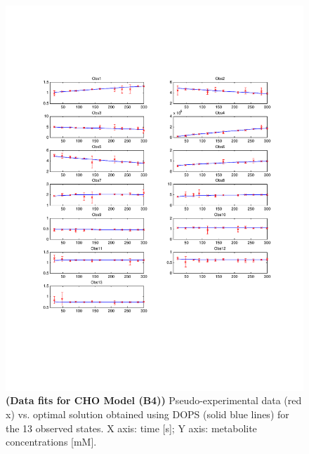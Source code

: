 \documentclass[12pt]{article}
\begin{document}
\begin{figure}[ht]
\centering
\includegraphics[width=1.00\textwidth]{./figs/Figure_S2_B4_sims.pdf}
\caption{\textbf {(Data fits for CHO Model (B4))} Pseudo-experimental data (red x) vs. optimal solution obtained using DOPS (solid blue lines) for the 13 observed states. X axis: time [s]; Y axis: metabolite concentrations [mM].
}\label{fig-sims-b4}
\end{figure}
\end{document}

